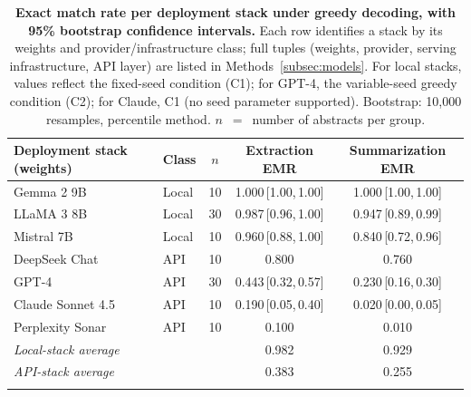 \documentclass[sn-nature]{sn-jnl}
\begin{document}
\begin{table}[t]
\caption{\textbf{Exact match rate per deployment stack under greedy decoding, with 95\% bootstrap confidence intervals.}
Each row identifies a stack by its weights and provider/infrastructure class; full tuples (weights, provider, serving infrastructure, API layer) are listed in Methods~\ref{subsec:models}.
For local stacks, values reflect the fixed-seed condition (C1); for GPT-4, the variable-seed greedy condition (C2); for Claude, C1 (no seed parameter supported).
Bootstrap: 10,000 resamples, percentile method.
$n$~$=$~number of abstracts per group.}\label{tab:main}
\footnotesize
\begin{tabular}{@{}llccc@{}}
\toprule
\textbf{Deployment stack (weights)} & \textbf{Class} & \textbf{$n$} & \textbf{Extraction EMR} & \textbf{Summarization EMR} \\
\midrule
Gemma 2 9B      & Local & 10 & 1.000\,[1.00,\,1.00] & 1.000\,[1.00,\,1.00] \\
LLaMA 3 8B      & Local & 30 & 0.987\,[0.96,\,1.00] & 0.947\,[0.89,\,0.99] \\
Mistral 7B      & Local & 10 & 0.960\,[0.88,\,1.00] & 0.840\,[0.72,\,0.96] \\
\midrule
DeepSeek Chat   & API   & 10 & 0.800 & 0.760 \\
GPT-4           & API   & 30 & 0.443\,[0.32,\,0.57] & 0.230\,[0.16,\,0.30] \\
Claude Sonnet 4.5 & API & 10 & 0.190\,[0.05,\,0.40] & 0.020\,[0.00,\,0.05] \\
Perplexity Sonar & API  & 10 & 0.100 & 0.010 \\
\midrule
\multicolumn{2}{l}{\textit{Local-stack average}} & & 0.982 & 0.929 \\
\multicolumn{2}{l}{\textit{API-stack average}}   & & 0.383 & 0.255 \\
\botrule
\end{tabular}
\normalsize
\end{table}
\end{document}
